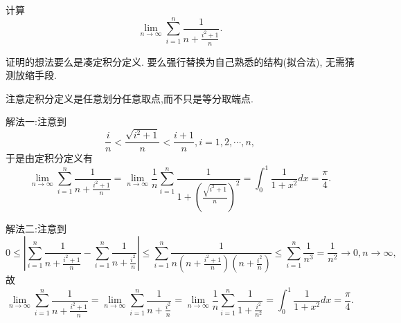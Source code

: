\documentclass[lang=cn,newtx,10pt,scheme=chinese]{elegantbook}
\begin{document}
\begin{example}
计算
\[
\lim_{n\rightarrow\infty}\sum_{i = 1}^{n}\frac{1}{n+\frac{i^{2}+1}{n}}.
\]
\end{example}
\begin{note}
   证明的想法要么是凑定积分定义. 要么强行替换为自己熟悉的结构(拟合法), 无需猜测放缩手段.
\end{note}
\begin{remark}
   注意定积分定义是任意划分任意取点,而不只是等分取端点.
\end{remark}
\begin{solution}
{\color{blue}解法一:}注意到
\[
\frac{i}{n}<\frac{\sqrt{i^{2}+1}}{n}<\frac{i + 1}{n},i = 1,2,\cdots,n,
\]
于是由定积分定义有
\[
\lim_{n\rightarrow\infty}\sum_{i = 1}^{n}\frac{1}{n+\frac{i^{2}+1}{n}}=\lim_{n\rightarrow\infty}\frac{1}{n}\sum_{i = 1}^{n}\frac{1}{1+\left(\frac{\sqrt{i^{2}+1}}{n}\right)^{2}}=\int_{0}^{1}\frac{1}{1 + x^{2}}dx=\frac{\pi}{4}.
\]

{\color{blue}解法二:}注意到
\[
0\leq\left|\sum_{i = 1}^{n}\frac{1}{n+\frac{i^{2}+1}{n}}-\sum_{i = 1}^{n}\frac{1}{n+\frac{i^{2}}{n}}\right|\leqslant\sum_{i = 1}^{n}\frac{1}{n\left(n+\frac{i^{2}+1}{n}\right)\left(n+\frac{i^{2}}{n}\right)}\leqslant\sum_{i = 1}^{n}\frac{1}{n^{3}}=\frac{1}{n^{2}}\rightarrow0,n\rightarrow\infty,
\]
故
\[
\lim_{n\rightarrow\infty}\sum_{i = 1}^{n}\frac{1}{n+\frac{i^{2}+1}{n}}=\lim_{n\rightarrow\infty}\sum_{i = 1}^{n}\frac{1}{n+\frac{i^{2}}{n}}=\lim_{n\rightarrow\infty}\frac{1}{n}\sum_{i = 1}^{n}\frac{1}{1+\frac{i^{2}}{n^{2}}}=\int_{0}^{1}\frac{1}{1 + x^{2}}dx=\frac{\pi}{4}.
\]
\end{solution}
\end{document}
